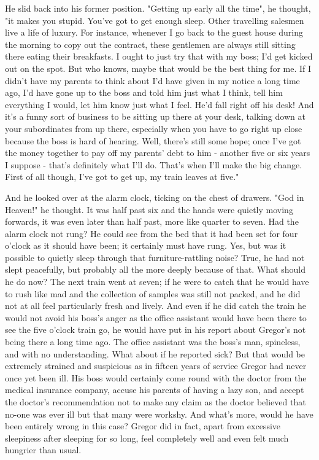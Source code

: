 \documentclass[12pt]{book}
\begin{document}
    He slid back into his former position. "Getting up early all the time", he thought, "it makes you stupid. You've got to get enough sleep. Other travelling salesmen live a life of luxury. For instance, whenever I go back to the guest house during the morning to copy out the contract, these gentlemen are always still sitting there eating their breakfasts. I ought to just try that with my boss; I'd get kicked out on the spot. But who knows, maybe that would be the best thing for me. If I didn't have my parents to think about I'd have given in my notice a long time ago, I'd have gone up to the boss and told him just what I think, tell him everything I would, let him know just what I feel. He'd fall right off his desk! And it's a funny sort of business to be sitting up there at your desk, talking down at your subordinates from up there, especially when you have to go right up close because the boss is hard of hearing. Well, there's still some hope; once I've got the money together to pay off my parents' debt to him - another five or six years I suppose - that's definitely what I'll do. That's when I'll make the big change. First of all though, I've got to get up, my train leaves at five."

    And he looked over at the alarm clock, ticking on the chest of drawers. "God in Heaven!" he thought. It was half past six and the hands were quietly moving forwards, it was even later than half past, more like quarter to seven. Had the alarm clock not rung? He could see from the bed that it had been set for four o'clock as it should have been; it certainly must have rung. Yes, but was it possible to quietly sleep through that furniture-rattling noise? True, he had not slept peacefully, but probably all the more deeply because of that. What should he do now? The next train went at seven; if he were to catch that he would have to rush like mad and the collection of samples was still not packed, and he did not at all feel particularly fresh and lively. And even if he did catch the train he would not avoid his boss's anger as the office assistant would have been there to see the five o'clock train go, he would have put in his report about Gregor's not being there a long time ago. The office assistant was the boss's man, spineless, and with no understanding. What about if he reported sick? But that would be extremely strained and suspicious as in fifteen years of service Gregor had never once yet been ill. His boss would certainly come round with the doctor from the medical insurance company, accuse his parents of having a lazy son, and accept the doctor's recommendation not to make any claim as the doctor believed that no-one was ever ill but that many were workshy. And what's more, would he have been entirely wrong in this case? Gregor did in fact, apart from excessive sleepiness after sleeping for so long, feel completely well and even felt much hungrier than usual.
\end{document}
